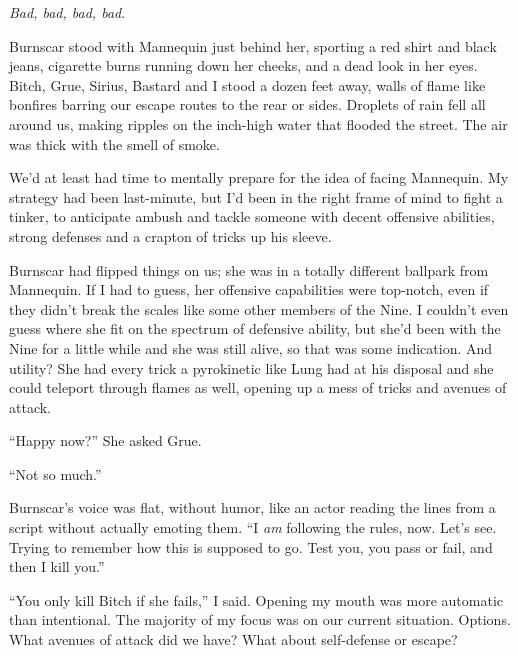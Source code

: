 





\emph{Bad, bad, bad, bad}.



Burnscar stood with Mannequin just behind her, sporting a red shirt and black jeans, cigarette burns running down her cheeks, and a dead look in her eyes.  Bitch, Grue, Sirius, Bastard and I stood a dozen feet away, walls of flame like bonfires barring our escape routes to the rear or sides.  Droplets of rain fell all around us, making ripples on the inch-high water that flooded the street.  The air was thick with the smell of smoke.



We'd at least had time to mentally prepare for the idea of facing Mannequin.  My strategy had been last-minute, but I'd been in the right frame of mind to fight a tinker, to anticipate ambush and tackle someone with decent offensive abilities, strong defenses and a crapton of tricks up his sleeve.



Burnscar had flipped things on us; she was in a totally different ballpark from Mannequin.  If I had to guess, her offensive capabilities were top-notch, even if they didn't break the scales like some other members of the Nine.  I couldn't even guess where she fit on the spectrum of defensive ability, but she'd been with the Nine for a little while and she was still alive, so that was some indication.  And utility?  She had every trick a pyrokinetic like Lung had at his disposal and she could teleport through flames as well, opening up a mess of tricks and avenues of attack.



``Happy now?'' She asked Grue.



``Not so much.''



Burnscar's voice was flat, without humor, like an actor reading the lines from a script without actually emoting them.  ``I \emph{am} following the rules, now.  Let's see.  Trying to remember how this is supposed to go. Test you, you pass or fail, and then I kill you.''



``You only kill Bitch if she fails,'' I said.  Opening my mouth was more automatic than intentional.  The majority of my focus was on our current situation.  Options.  What avenues of attack did we have?  What about self-defense or escape?



